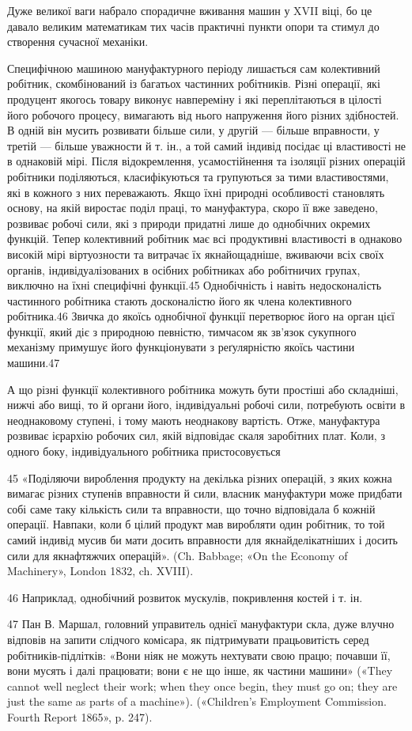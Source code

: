 Дуже великої ваги набрало спорадичне вживання машин у
XVII віці, бо це давало великим математикам тих часів практичні
пункти опори та стимул до створення сучасної механіки.

Специфічною машиною мануфактурного періоду лишається
сам колективний робітник, скомбінований із багатьох частинних
робітників. Різні операції, які продуцент якогось товару виконує
навпереміну і які переплітаються в цілості його робочого процесу,
вимагають від нього напруження його різних здібностей.
В одній він мусить розвивати більше сили, у другій — більше
вправности, у третій — більше уважности й т. ін., а той самий
індивід посідає ці властивості не в однаковій мірі. Після відокремлення,
усамостійнення та ізоляції різних операцій робітники
поділяються, класифікуються та групуються за тими властивостями,
які в кожного з них переважають. Якщо їхні природні
особливості становлять основу, на якій виростає поділ праці,
то мануфактура, скоро її вже заведено, розвиває робочі сили, які
з природи придатні лише до однобічних окремих функцій. Тепер
колективний робітник має всі продуктивні властивості в однаково
високій мірі віртуозности та витрачає їх якнайощадніше, вживаючи
всіх своїх органів, індивідуалізованих в осібних робітниках
або робітничих групах, виключно на їхні специфічні функції.45
Однобічність і навіть недосконалість частинного робітника стають
досконалістю його як члена колективного робітника.46 Звичка
до якоїсь однобічної функції перетворює його на орган цієї
функції, який діє з природною певністю, тимчасом як зв’язок
сукупного механізму примушує його функціонувати з реґулярністю
якоїсь частини машини.47

А що різні функції колективного робітника можуть бути
простіші або складніші, нижчі або вищі, то й органи його, індивідуальні
робочі сили, потребують освіти в неоднаковому ступені,
і тому мають неоднакову вартість. Отже, мануфактура розвиває
ієрархію робочих сил, якій відповідає скаля заробітних плат.
Коли, з одного боку, індивідуального робітника пристосовується

45 «Поділяючи вироблення продукту на декілька різних операцій,
з яких кожна вимагає різних ступенів вправности й сили, власник мануфактури
може придбати собі саме таку кількість сили та вправности,
що точно відповідала б кожній операції. Навпаки, коли б цілий продукт
мав виробляти один робітник, то той самий індивід мусив би мати досить
вправности для якнайделікатніших і досить сили для якнафтяжчих
операцій». (Ch. Babbage; «On the Economy of Machinery», London 1832,
ch. XVIII).

46    Наприклад, однобічний розвиток мускулів, покривлення костей
і т. ін.

47    Пан В. Маршал, головний управитель однієї мануфактури скла,
дуже влучно відповів на запити слідчого комісара, як підтримувати
працьовитість серед робітників-підлітків: «Вони ніяк не можуть нехтувати
свою працю; почавши її, вони мусять і далі працювати; вони
є не що інше, як частини машини» («They cannot well neglect their work;
when they once begin, they must go on; they are just the same as parts of
a machine»). («Children’s Employment Commission. Fourth Report 1865»,
p. 247).

